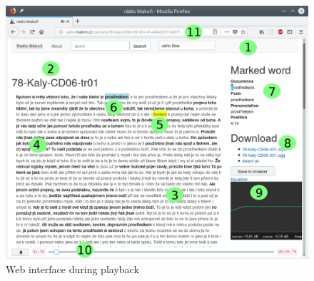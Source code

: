 \documentclass{svproc}
\begin{document}
\begin{figure}[htpb]
\includegraphics[scale=0.6]{rc/radio-makon-en-1-lab.png}
\caption{Web interface during playback}
\label{fig:scn1lab}
\end{figure}
\end{document}
